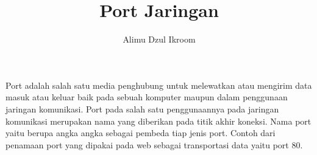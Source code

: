 \documentclass[a4paper,12pt,times new roman]{article}
\title{Port Jaringan}
\author{Alimu Dzul Ikroom}
\begin{document}
	\indent Port adalah salah satu media penghubung untuk melewatkan atau mengirim data masuk atau keluar baik pada sebuah komputer maupun dalam penggunaan jaringan komunikasi. Port pada salah satu penggunaannya pada jaringan komunikasi merupakan nama yang diberikan pada titik akhir koneksi. Nama port yaitu berupa angka angka sebagai pembeda tiap  jenis port. Contoh dari penamaan port yang dipakai pada web sebagai transportasi data yaitu port 80.
\end{document}
